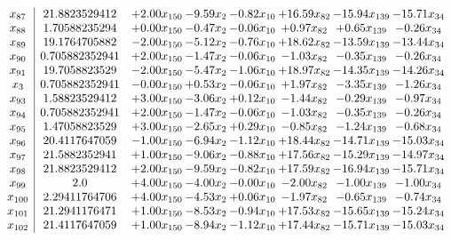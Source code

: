 \documentclass[8pt]{article}
\begin{document}
\[\begin{array}{c| c c@{\hskip 2pt} c@{\hskip 2pt} c@{\hskip 2pt} c@{\hskip 2pt} c@{\hskip 2pt} c@{\hskip 2pt} }
 x_{87}   &  21.8823529412 & +  2.00 x_{150} & -9.59 x_{2} & -0.82 x_{10} & + 16.59 x_{82} & -15.94 x_{139} & -15.71 x_{34}\\
 x_{88}   &  1.70588235294 & +  0.00 x_{150} & -0.47 x_{2} & -0.06 x_{10} & +  0.97 x_{82} & +  0.65 x_{139} & -0.26 x_{34}\\
 x_{89}   &  19.1764705882 & -2.00 x_{150} & -5.12 x_{2} & -0.76 x_{10} & + 18.62 x_{82} & -13.59 x_{139} & -13.44 x_{34}\\
 x_{90}   &  0.705882352941 & +  2.00 x_{150} & -1.47 x_{2} & -0.06 x_{10} & -1.03 x_{82} & -0.35 x_{139} & -0.26 x_{34}\\
 x_{91}   &  19.7058823529 & -2.00 x_{150} & -5.47 x_{2} & -1.06 x_{10} & + 18.97 x_{82} & -14.35 x_{139} & -14.26 x_{34}\\
 x_{3}   &  0.705882352941 & -0.00 x_{150} & +  0.53 x_{2} & -0.06 x_{10} & +  1.97 x_{82} & -3.35 x_{139} & -1.26 x_{34}\\
 x_{93}   &  1.58823529412 & +  3.00 x_{150} & -3.06 x_{2} & +  0.12 x_{10} & -1.44 x_{82} & -0.29 x_{139} & -0.97 x_{34}\\
 x_{94}   &  0.705882352941 & +  2.00 x_{150} & -1.47 x_{2} & -0.06 x_{10} & -1.03 x_{82} & -0.35 x_{139} & -0.26 x_{34}\\
 x_{95}   &  1.47058823529 & +  3.00 x_{150} & -2.65 x_{2} & +  0.29 x_{10} & -0.85 x_{82} & -1.24 x_{139} & -0.68 x_{34}\\
 x_{96}   &  20.4117647059 & -1.00 x_{150} & -6.94 x_{2} & -1.12 x_{10} & + 18.44 x_{82} & -14.71 x_{139} & -15.03 x_{34}\\
 x_{97}   &  21.5882352941 & +  1.00 x_{150} & -9.06 x_{2} & -0.88 x_{10} & + 17.56 x_{82} & -15.29 x_{139} & -14.97 x_{34}\\
 x_{98}   &  21.8823529412 & +  2.00 x_{150} & -9.59 x_{2} & -0.82 x_{10} & + 17.59 x_{82} & -16.94 x_{139} & -15.71 x_{34}\\
 x_{99}   &  2.0 & +  4.00 x_{150} & -4.00 x_{2} & -0.00 x_{10} & -2.00 x_{82} & -1.00 x_{139} & -1.00 x_{34}\\
 x_{100}   &  2.29411764706 & +  4.00 x_{150} & -4.53 x_{2} & +  0.06 x_{10} & -1.97 x_{82} & -0.65 x_{139} & -0.74 x_{34}\\
 x_{101}   &  21.2941176471 & +  1.00 x_{150} & -8.53 x_{2} & -0.94 x_{10} & + 17.53 x_{82} & -15.65 x_{139} & -15.24 x_{34}\\
 x_{102}   &  21.4117647059 & +  1.00 x_{150} & -8.94 x_{2} & -1.12 x_{10} & + 17.44 x_{82} & -15.71 x_{139} & -15.03 x_{34}\\

\end{array}\]
\end{document}
